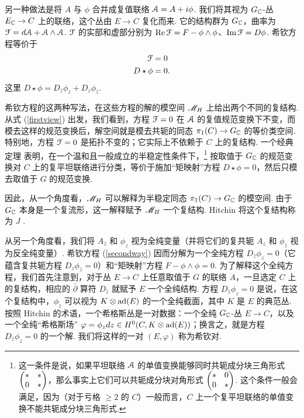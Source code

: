 另一种做法是将 $A$ 与 $\phi$ 合并成复值联络 ${\cal A}=A+i\phi$. 我们将其视为 $G_{\mathbb C}$-丛 $E_{\mathbb C}\to C$ 上的联络，这个丛由 $E\to C$ 复化而来. 它的结构群为 $G_{\mathbb C}$，曲率为 ${\mathcal F}=d {\mathcal A}+{\mathcal A}\wedge {\mathcal A}$. ${\mathcal F}$ 的实部和虚部分别为 ${\rm Re}\,{\cal F}=F-\phi\wedge\phi$、${\rm Im}\,{\cal F}=D\phi$. 希钦方程等价于
\begin{align}\label{firstview}
 {\mathcal F} & = 0 \nonumber \\
                     D\star \phi&=0. \end{align}
这里 $D\star\phi=D_{\bar z}\phi_z+D_z\phi_{\bar z}$.

希钦方程的这两种写法，在这些方程的解的模空间 ${{\mathscr{M}}_H}$ 上给出两个不同的复结构. 从式 (\ref{firstview}) 出发，我们看到，方程 ${\mathcal F}=0$ 在 ${\mathcal A}$ 的复值规范变换下不变，而模去这样的规范变换后，解空间就是模去共轭的同态 $\pi_1(C)\to G_{\mathbb C}$ 的等价类空间. 特别地，方程 ${\mathcal F}=0$ 是拓扑不变的；它实际上不依赖于 $C$ 上的复结构. 一个经典定理 \cite{Corlette} 表明，在一个温和且一般成立的半稳定性条件下，\footnote{这一条件是说，如果平坦联络 ${\mathcal A}$ 的单值变换能够同时共轭成分块三角形式 $\begin{pmatrix} * & * \cr 0 & * \end{pmatrix}$，那么事实上它们可以共轭成分块对角形式 $\begin{pmatrix} * & 0 \cr 0 & * \end{pmatrix}$. 这个条件一般会满足，因为（对于亏格 $\geq 2$ 的 $C$）一般而言，$C$ 上一个复平坦联络的单值变换不能共轭成分块三角形式.} 按取值于 $G_{\mathbb C}$ 的规范变换对 $C$ 上的复平坦联络进行分类，等价于施加“矩映射”方程 $D\star\phi=0$，然后只模去取值于 $G$ 的规范变换.

因此，从一个角度看，${{\mathscr{M}}_H}$ 可以解释为半稳定同态 $\pi_1(C)\to G_{\mathbb C}$ 的模空间. 由于 $G_{\mathbb C}$ 本身是一个复流形，这一解释赋予 ${{\mathscr{M}}_H}$ 一个复结构. Hitchin 将这个复结构称为 $J$ \cite{Hitchin}.

从另一个角度看，我们将 $A_{\bar z}$ 和 $\phi_z$ 视为全纯变量（并将它们的复共轭 $A_z$ 和 $\phi_{\bar z}$ 视为反全纯变量）. 希钦方程 (\ref{secondway}) 因而分解为一个全纯方程 $D_{\bar z}\phi_z=0$（它蕴含复共轭方程 $D_z\phi_{\bar z}=0$）和“矩映射”方程 $F-\phi\wedge\phi=0$. 为了解释这个全纯方程，我们首先注意到，对于丛 $E\to C$ 上任意取值于 $G$ 的联络 $A$，一旦选定 $C$ 上的复结构，相应的 $\bar\partial$ 算符 $D_{\bar z}$ 就赋予 $E$ 一个全纯结构. 方程 $D_{\bar z}\phi_z=0$ 是说，在这个复结构中，$\phi_z$ 可以视为 $K\otimes {\mathrm{ad}(E)}$ 的一个全纯截面，其中 $K$ 是 $E$ 的典范丛. 按照 Hitchin 的术语，一个希格斯丛是一对数据：一个全纯 $G_{\mathbb C}$-丛 $E\to C$，以及一个全纯“希格斯场” $\varphi=\phi_z d z\in H^0(C,K\otimes {\mathrm{ad}(E)})$；换言之，就是方程 $D_{\bar z}\phi_z=0$ 的一个解. 我们将这样的一对 $(E,\varphi)$ 称为希钦对.

